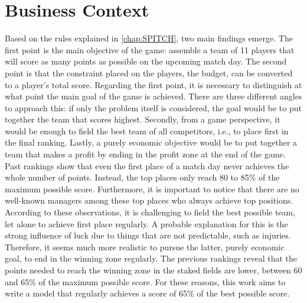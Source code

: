 \section{Business Context}

Based on the rules explained in \autoref{chap:SPITCH}, two main findings emerge. The first point is the main objective of the game: assemble a team of 11 players that will score as many points as possible on the upcoming match day. The second point is that the constraint placed on the players, the budget, can be converted to a player's total score. Regarding the first point, it is necessary to distinguish at what point the main goal of the game is achieved. There are three different angles to approach this: if only the problem itself is considered, the goal would be to put together the team that scores highest. Secondly, from a game perspective, it would be enough to field the best team of all competitors, i.e., to place first in the final ranking. Lastly, a purely economic objective would be to put together a team that makes a profit by ending in the profit zone at the end of the game. Past rankings show that even the first place of a match day never achieves the whole number of points. Instead, the top places only reach 80 to 85\% of the maximum possible score. Furthermore, it is important to notice that there are no well-known managers among these top places who always achieve top positions. According to these observations, it is challenging to field the best possible team, let alone to achieve first place regularly. A probable explanation for this is the strong influence of luck due to things that are not predictable, such as injuries. Therefore, it seems much more realistic to pursue the latter, purely economic goal, to end in the winning zone regularly. The previous rankings reveal that the points needed to reach the winning zone in the staked fields are lower, between 60 and 65\% of the maximum possible score. For these reasons, this work aims to write a model that regularly achieves a score of 65\% of the best possible score.

